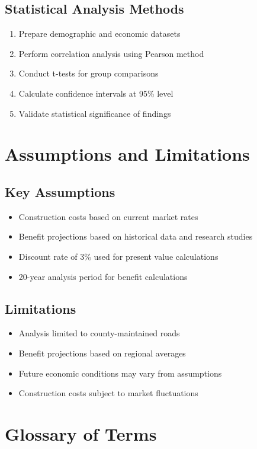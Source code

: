 \documentclass[11pt,letterpaper]{report}
\begin{document}
\subsection{Statistical Analysis Methods}
\begin{enumerate}
    \item Prepare demographic and economic datasets
    \item Perform correlation analysis using Pearson method
    \item Conduct t-tests for group comparisons
    \item Calculate confidence intervals at 95\% level
    \item Validate statistical significance of findings
\end{enumerate}

\section{Assumptions and Limitations}

\subsection{Key Assumptions}
\begin{itemize}
    \item Construction costs based on current market rates
    \item Benefit projections based on historical data and research studies
    \item Discount rate of 3\% used for present value calculations
    \item 20-year analysis period for benefit calculations
\end{itemize}

\subsection{Limitations}
\begin{itemize}
    \item Analysis limited to county-maintained roads
    \item Benefit projections based on regional averages
    \item Future economic conditions may vary from assumptions
    \item Construction costs subject to market fluctuations
\end{itemize}

\section{Glossary of Terms}
\end{document}
